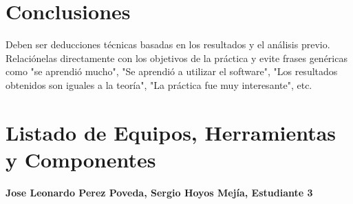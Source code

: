 \documentclass[12pt]{article}
\newcommand{\estudiantes}{Jose Leonardo Perez Poveda, Sergio Hoyos Mejía, Estudiante 3}
\begin{document}
\section{Conclusiones}
Deben ser deducciones técnicas basadas en los resultados y el análisis previo. Relaciónelas directamente con los objetivos de la práctica y evite frases genéricas como "se aprendió mucho", "Se aprendió a utilizar el software", "Los resultados obtenidos son iguales a la teoría", "La práctica fue muy interesante", etc.




\newpage

\section*{Listado de Equipos, Herramientas y Componentes}

{\textbf{\estudiantes}}
\end{document}

